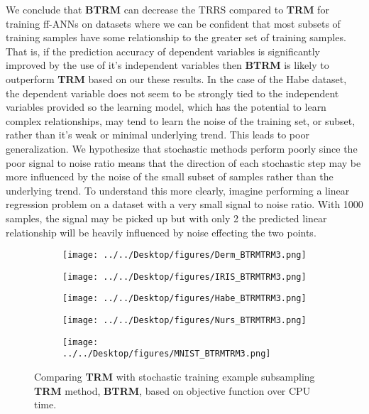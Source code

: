 \documentclass[letterpaper,12pt,titlepage,oneside,final]{book}
\begin{document}
	
	We conclude that \textbf{BTRM} can decrease the TRRS compared to \textbf{TRM} for training ff-ANNs on datasets where we can be confident that most subsets of training samples have some relationship to the greater set of training samples. That is, if the prediction accuracy of dependent variables is significantly improved by the use of it's independent variables then \textbf{BTRM} is likely to outperform \textbf{TRM} based on our these results. In the case of the Habe dataset, the dependent variable does not seem to be strongly tied to the independent variables provided so the learning model, which has the potential to learn complex relationships, may tend to learn the noise of the training set, or subset, rather than it's weak or minimal underlying trend. This leads to poor generalization. We hypothesize that stochastic methods perform poorly since the poor signal to noise ratio means that the direction of each stochastic step may be more influenced by the noise of the small subset of samples rather than the underlying trend. To understand this more clearly, imagine performing a linear regression problem on a dataset with a very small signal to noise ratio. With 1000 samples, the signal may be picked up but with only 2 the predicted linear relationship will be heavily influenced by noise effecting the two points. 
	
	\begin{figure}
		\centering
		\begin{subfigure}{.45\textwidth}
			\texttt{[image: ../../Desktop/figures/Derm\_BTRMTRM3.png]}
		\end{subfigure}%
		\begin{subfigure}{.45\textwidth}
			\texttt{[image: ../../Desktop/figures/IRIS\_BTRMTRM3.png]}
		\end{subfigure}
		\begin{subfigure}{.45\textwidth}
			\texttt{[image: ../../Desktop/figures/Habe\_BTRMTRM3.png]}
		\end{subfigure}
		\begin{subfigure}{.45\textwidth}
			\texttt{[image: ../../Desktop/figures/Nurs\_BTRMTRM3.png]}
		\end{subfigure}
		\begin{subfigure}{.45\textwidth}
			\texttt{[image: ../../Desktop/figures/MNIST\_BTRMTRM3.png]}
		\end{subfigure}
		\caption{Comparing \textbf{TRM} with stochastic training example subsampling \textbf{TRM} method, \textbf{BTRM}, based on objective function over CPU time.}
		\label{figure:BTRMTRM}
	\end{figure}
\end{document}
